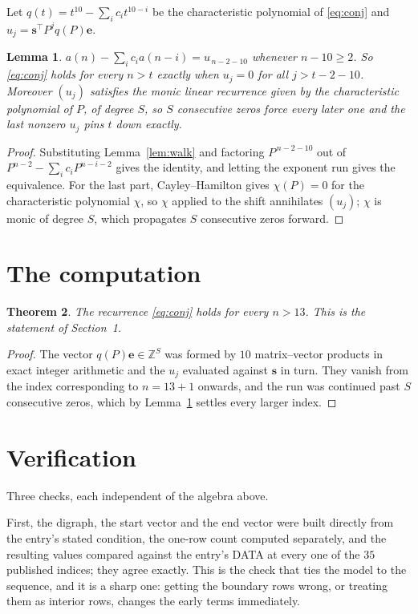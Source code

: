 \documentclass[11pt,a4paper]{article}
\theoremstyle{plain}
\newtheorem{theorem}{Theorem}
\newtheorem{lemma}[theorem]{Lemma}
\theoremstyle{definition}
\begin{document}
Let $q(t)=t^{10}-\sum_i c_i t^{10-i}$ be the characteristic polynomial of
\eqref{eq:conj} and $u_j=\mathbf{s}^{\!\top}P^{j}q(P)\mathbf{e}$.

\begin{lemma}\label{lem:crit}
$a(n)-\sum_i c_i a(n-i)=u_{\,n-2-10}$ whenever $n-10\ge2$. So \eqref{eq:conj}
holds for every $n>t$ exactly when $u_j=0$ for all $j>t-2-10$. Moreover $(u_j)$
satisfies the monic linear recurrence given by the characteristic polynomial of $P$, of
degree $S$, so $S$ consecutive zeros force every later one and the last nonzero $u_j$ pins
$t$ down exactly.
\end{lemma}

\begin{proof}
Substituting Lemma~\ref{lem:walk} and factoring $P^{\,n-2-10}$ out of
$P^{n-2}-\sum_i c_i P^{n-i-2}$ gives the identity, and letting the exponent run gives the
equivalence. For the last part, Cayley--Hamilton gives $\chi(P)=0$ for the characteristic
polynomial $\chi$, so $\chi$ applied to the shift annihilates $(u_j)$; $\chi$ is monic of
degree $S$, which propagates $S$ consecutive zeros forward.
\end{proof}

\section{The computation}

\begin{theorem}
The recurrence \eqref{eq:conj} holds for every $n>13$. This is the statement of
Section~1.
\end{theorem}

\begin{proof}
The vector $q(P)\mathbf{e}\in\mathbb{Z}^{S}$ was formed by $10$ matrix--vector
products in exact integer arithmetic and the $u_j$ evaluated against $\mathbf{s}$ in turn.
They vanish from the index corresponding to $n=13+1$ onwards, and the run was continued
past $S$ consecutive zeros, which by Lemma~\ref{lem:crit} settles every larger index.
\end{proof}

\section{Verification}

Three checks, each independent of the algebra above.

First, the digraph, the start vector and the end vector were built directly from the
entry's stated condition, the one-row count computed separately, and the resulting values
compared against the entry's DATA at every one of the $35$ published indices; they
agree exactly. This is the check that ties the model to the sequence, and it is a sharp one:
getting the boundary rows wrong, or treating them as interior rows, changes the early terms
immediately.
\end{document}
